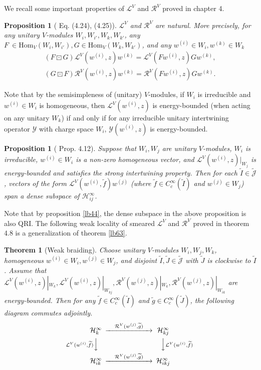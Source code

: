 \documentclass[11pt,b5paper,notitlepage]{article}
\theoremstyle{definition}
\theoremstyle{plain}
\newtheorem{thm}[df]{Theorem}
\newtheorem{pp}[df]{Proposition}
\newcommand{\mc}{\mathcal}
\newcommand{\wtd}{\widetilde}
\newcommand{\Hom}{\mathrm{Hom}}
\newcommand{\Jtd}{\widetilde{\mathcal J}}
\numberwithin{equation}{subsection}
\begin{document}
We recall some important properties of $\mc L^V$ and $\mc R^V$ proved in \cite{Gui21a} chapter 4.

\begin{pp}[\cite{Gui21a} Eq. (4.24), (4.25)]\label{lb57}
$\mc L^V$ and $\mc R^V$ are natural. More precisely, for any unitary $V$-modules $W_i,W_{i'},W_k,W_{k'}$, any $F\ \in\Hom_V(W_i,W_{i'}),G\in\Hom_V(W_k,W_{k'})$, and any $w^{(i)}\in W_i,w^{(k)}\in W_k$
\begin{gather}
(F\boxdot G)\mc L^V(w^{(i)},z)w^{(k)}=\mc L^V(Fw^{(i)},z)Gw^{(k)},\label{eq70}\\
(G\boxdot F)\mc R^V(w^{(i)},z)w^{(k)}=\mc R^V(Fw^{(i)},z)Gw^{(k)}.\label{eq74}
\end{gather}
\end{pp}


Note that by the semisimpleness of (unitary) $V$-modules, if $W_i$ is irreducible and $w^{(i)}\in W_i$ is homogeneous, then $\mc L^V(w^{(i)},z)$ is energy-bounded (when acting on any unitary $W_k$) if and only if  for any irreducible unitary intertwining operator $\mc Y$ with charge space $W_i$, $\mc Y(w^{(i)},z)$ is energy-bounded.

\begin{pp}[\cite{Gui21a} Prop. 4.12]\label{lb58}
Suppose that $W_i,W_j$ are unitary $V$-modules, $W_i$ is irreducible, $w^{(i)}\in W_i$ is a non-zero homogeneous vector, and $\mc L^V(w^{(i)},z)|_{W_j}$ is energy-bounded and satisfies the strong intertwining property.  Then for each  $\wtd I\in\Jtd$, vectors of the form $\mc L^V(w^{(i)},\wtd f)w^{(j)}$ (where $\wtd f\in C_c^\infty(\wtd I)$ and $w^{(j)}\in W_j$) span a dense subspace of $\mc H_{ij}^\infty$.
\end{pp}


Note that by proposition \ref{lb44}, the dense subspace in the above proposition is also QRI. The following weak locality of smeared $\mc L^V$ and $\mc R^V$  proved in \cite{Gui21a} theorem 4.8 is a generalization of theorem \ref{lb63}.

\begin{thm}[Weak braiding]\label{lb60}
Choose unitary $V$-modules $W_i,W_j,W_k$, homogeneous $w^{(i)}\in W_i,w^{(j)}\in W_j$, and disjoint $\wtd I,\wtd J\in \Jtd$ with $\wtd J$ is clockwise to $\wtd I$. Assume that  $\mc L^V(w^{(i)},z)|_{W_k},\mc L^V(w^{(i)},z)|_{W_{kj}},\mc R^V(w^{(j)},z)|_{W_k},\mc R^V(w^{(j)},z)|_{W_{ik}}$ are energy-bounded. Then for any $\wtd f\in C_c^\infty(\wtd I)$ and $\wtd g\in C_c^\infty(\wtd J)$, the following diagram commutes adjointly.
	\begin{align}\label{eq42}
	\begin{CD}
	\mc H^\infty_k @> \quad\mc R^V(w^{(j)},\wtd g)\quad >> \mc H^\infty_{kj}\\
	@V {\mc L^V(w^{(i)},\wtd f)} VV @VV {\mc L^V(w^{(i)},\wtd f)} V\\
	\mc H^\infty_{ik} @> \quad\mc R^V(w^{(j)},\wtd g)\quad>> \mc H^\infty_{ikj}
	\end{CD}
	\end{align}
\end{thm}
\end{document}

